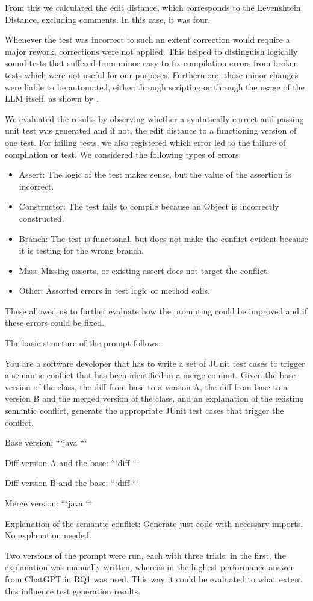 From this we calculated the edit distance, which corresponds to the Levenshtein Distance, excluding comments.
In this case, it was four.

Whenever the test was incorrect to such an extent correction would require a major rework, corrections were not applied. This helped to distinguish logically sound tests
that suffered from minor easy-to-fix compilation errors from broken tests which were not useful for our purposes. Furthermore, these minor changes were liable to be automated,
either through scripting or through the usage of the LLM itself, as shown by .

We evaluated the results by observing whether a syntatically correct and passing unit test was generated and if not, the edit distance to a functioning version of one test. 
For failing tests, we also registered which error led to the failure of compilation or test. 
We considered the following types of errors:
\begin{itemize}
  \item Assert: The logic of the test makes sense, but the value of the assertion is incorrect.
  \item Constructor: The test fails to compile because an Object is incorrectly constructed.
  \item Branch: The test is functional, but does not make the conflict evident because it is testing for the wrong branch.
  \item Miss: Missing asserts, or existing assert does not target the conflict.
  \item Other: Assorted errors in test logic or method calls.
\end{itemize}
These allowed us to further evaluate how the prompting could be improved and if these errors could be fixed.

The basic structure of the prompt follows:
\begin{prompt}
You are a software developer that has to write a set of JUnit test cases to trigger a semantic conflict that has been identified in a merge commit.
Given the base version of the class, the diff from base to a version A, the diff from base to a version B and the merged version of the class, and an explanation of the existing semantic conflict, generate the appropriate JUnit test cases that trigger the conflict.

Base version:
```java
```

Diff version A and the base:
```diff
```

Diff version B and the base:
```diff
```

Merge version:
```java
```

Explanation of the semantic conflict:
Generate just code with necessary imports. No explanation needed.
\end{prompt}
Two versions of the prompt were run, each with three trials: in the first, the explanation was manually written, whereas in the highest performance answer from ChatGPT in RQ1 was used.
This way it could be evaluated to what extent this influence test generation results.



